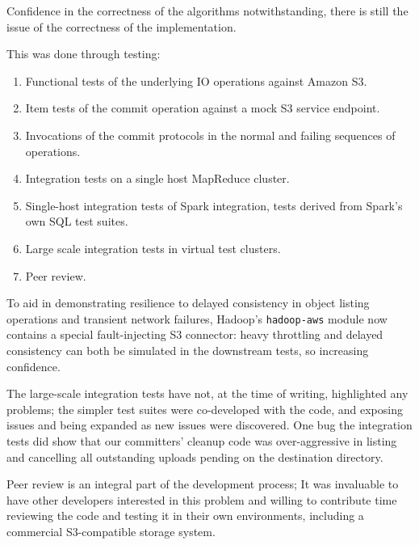 \documentclass[conference]{IEEEtran}
\begin{document}
Confidence in the correctness of the algorithms notwithstanding, there
is still the issue of the correctness of the implementation.


This was done through testing:

\begin{enumerate}
  \item Functional tests of the underlying IO operations against Amazon S3.
  \item Item tests of the commit operation against a mock S3 service endpoint.
  \item Invocations of the commit protocols in the normal and failing sequences of operations.
  \item Integration tests on a single host MapReduce cluster.
  \item Single-host integration tests of Spark integration, tests derived from Spark's own SQL test suites.
  \item Large scale integration tests in virtual test clusters.
  \item Peer review.
\end{enumerate}

To aid in demonstrating resilience to delayed consistency in object listing
operations and transient network failures, Hadoop's \texttt{hadoop-aws} module
now contains a special fault-injecting S3 connector: heavy throttling and
delayed consistency can both be simulated in the downstream tests, so
increasing confidence.

The large-scale integration tests have not, at the time of writing, highlighted any problems;
the simpler test suites were co-developed with the code, and exposing issues and
being expanded as new issues were discovered.
One bug the integration tests did show that our committers' cleanup code was
over-aggressive in listing and cancelling all outstanding uploads pending
on the destination directory.

Peer review is an integral part of the development process;
It was invaluable to have other developers interested in this problem
and willing to contribute time reviewing the code and testing it
in their own environments, including a commercial S3-compatible
storage system.
\end{document}

